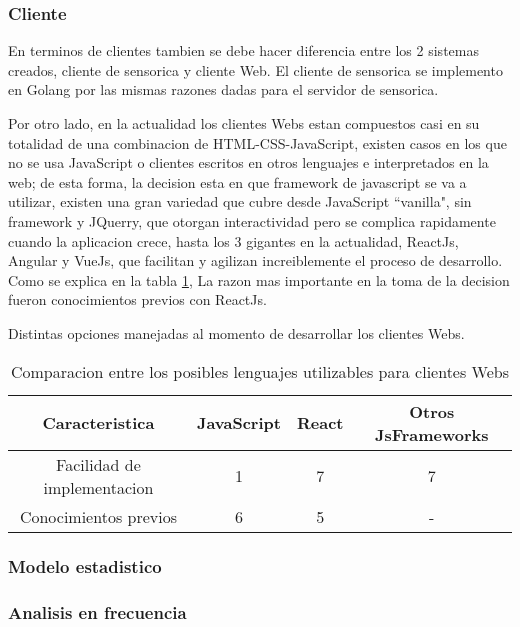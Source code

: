     \subsubsection{Cliente}

    En terminos de clientes tambien se debe hacer diferencia entre los 2 sistemas
    creados, cliente de sensorica y cliente Web. El cliente de sensorica se
    implemento en Golang por las mismas razones dadas para el servidor de sensorica.

    Por otro lado, en la actualidad los clientes Webs estan compuestos casi en
    su totalidad de una combinacion de HTML-CSS-JavaScript, existen casos en los
    que no se usa JavaScript o clientes escritos en otros lenguajes e interpretados
    en la web; de esta forma, la decision esta en que framework de javascript se
    va a utilizar, existen una gran variedad que cubre desde JavaScript ``vanilla",
    sin framework y JQuerry, que otorgan interactividad pero se complica rapidamente
    cuando la aplicacion crece, hasta los 3 gigantes en la actualidad, ReactJs,
    Angular y VueJs, que facilitan y agilizan increiblemente el proceso de desarrollo.
    Como se explica en la tabla \ref{tab:LenguajesCliente}, La razon mas importante
    en la toma de la decision fueron conocimientos previos con ReactJs.


    \begin{table}[ht]
        \begin{center}
            Distintas opciones manejadas al momento de desarrollar los clientes Webs.\\

            \vspace{0.3cm}
            \begin{tabular}{|c|c|c|c|}
                \hline
                Caracteristica              & JavaScript & React & Otros JsFrameworks\\\hline
                Facilidad de implementacion & 1         & 7     &  7\\\hline
                Conocimientos previos       & 6         & 5     &  - \\\hline
                \hline
            \end{tabular}
        \end{center}
        \caption[Comparativa de posibles lenguajes nivel cliente Web]{Comparacion entre
        los posibles lenguajes utilizables para clientes Webs}
        \label{tab:LenguajesCliente}
    \end{table}



    \subsubsection{Modelo estadistico}

    \subsubsection{Analisis en frecuencia}
